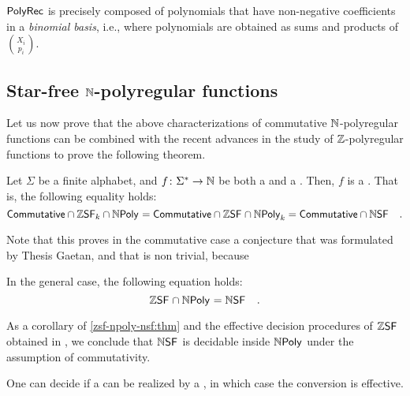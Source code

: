 \begin{conjecture}
    $\mathsf{PolyRec}$ is precisely composed of polynomials that
    have non-negative coefficients in a \emph{binomial basis},
    i.e., where polynomials are obtained
    as sums and products of $\binom{X_i}{p_i}$.
\end{conjecture}


\subsection{Star-free $\mathbb{N}$-polyregular functions}
\label{star-free:sec}


Let us now prove that the above characterizations of
commutative
$\mathbb{N}$-polyregular functions can be combined with the recent
advances in the study of $\mathbb{Z}$-polyregular functions 
\cite{LOPEZ23b}
to prove the following theorem.

\begin{theorem}
    \label{zsf-npoly-nsf:thm}
    Let $\Sigma$ be a finite alphabet, and $f \colon \Sigma^* \to \mathbb{N}$
    be both a 
    and a  .
    Then, $f$ is a  .
    That is, the following equality holds:
    \begin{equation*}
        \ZCommut \cap \ZSF[k] \cap \NPoly
        = \ZCommut \cap \ZSF \cap \NPoly[k]
        = \ZCommut \cap \NSF
        \quad .
    \end{equation*}
\end{theorem}

Note that this proves in the commutative case a conjecture that was 
formulated by Thesis Gaetan, and that is non trivial, because 

\begin{conjecture}
    \label{nsf-zsf:conj}
    In the general case, the following equation holds:
    \begin{equation*}
        \ZSF \cap \NPoly
        = 
        \NSF
        \quad .
    \end{equation*}
\end{conjecture}

As a corollary of \cref{zsf-npoly-nsf:thm} and the effective decision
procedures of $\ZSF$ obtained in \cite{LOPEZ23b}, we conclude that $\NSF$ is
decidable inside $\NPoly$ under the assumption of commutativity.

\begin{corollary}
    One can decide if a  
    can be realized by a ,
    in which case the conversion is effective.
\end{corollary}

